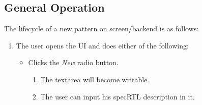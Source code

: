 \subsection{General Operation}
The lifecycle of a new pattern on screen/backend is as follows:
\begin{enumerate}
 \item {The user opens the UI and does either of the following:
 \begin{itemize}
  \item Clicks the \emph{New} radio button. 
  \begin{enumerate}
   \item The textarea will become writable.
   \item The user can input his specRTL description in it.
  \end{enumerate}
 \end{itemize}	%
 
}
\end{enumerate}

